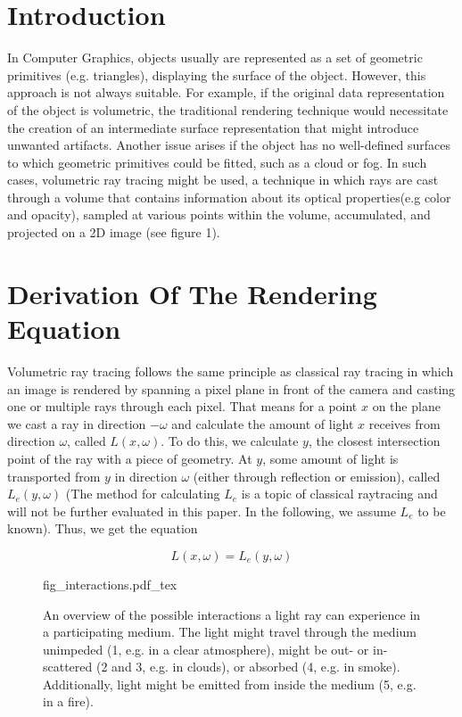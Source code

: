 \section{Introduction}
In Computer Graphics, objects usually are represented as a set of geometric primitives \cite{KOBBELT2004801} (e.g. triangles), displaying the surface of the object. However, this approach is not always suitable. For example, if the original data representation of the object is volumetric, the traditional rendering technique would necessitate the creation of an intermediate surface representation that might introduce unwanted artifacts\cite{511}. Another issue arises if the object has no well-defined surfaces to which geometric primitives could be fitted, such as a cloud or fog\cite{10.1145/964965.808594}. In such cases, volumetric ray tracing might be used, a technique in which rays are cast through a volume that contains information about its optical properties(e.g color and opacity), sampled at various points within the volume, accumulated, and projected on a 2D image (see figure 1)\cite{511}.





\section{Derivation Of The Rendering Equation}
Volumetric ray tracing follows the same principle as classical ray tracing in which an image is rendered by spanning a pixel plane in front of the camera and casting one or multiple rays through each pixel.
That means for a point ${x}$ on the plane we cast a ray in direction $-\omega$ and calculate the amount of light ${x}$ receives from direction $\omega$, called $L({x},\omega )$\cite{10.5555/94788}.
To do this, we calculate ${y}$, the closest intersection point of the ray with a piece of geometry. At ${y}$, some amount of light is transported from ${y}$ in direction $\omega$ (either through reflection or emission), called $L_e({y},\omega )$ (The method for calculating $L_e$ is a topic of classical raytracing\cite{10.5555/94788} and will not be further evaluated in this paper. In the following, we assume $L_e$ to be known).
Thus, we get the equation 

\begin{equation}\label{eq:no_attenuation}
L({x},\omega ) = L_e({y}, \omega )
\end{equation}

\begin{figure}
\centering
\def\svgwidth{\columnwidth}
{fig_interactions.pdf_tex}

\caption{An overview of the possible interactions a light ray can experience in a participating medium. The light might travel through the medium unimpeded (1, e.g. in a clear atmosphere), might be out- or in-scattered (2 and 3, e.g. in clouds), or absorbed (4, e.g. in smoke). Additionally, light might be emitted from inside the medium (5, e.g. in a fire).}
\label{fig:light_interactions}
\end{figure}


